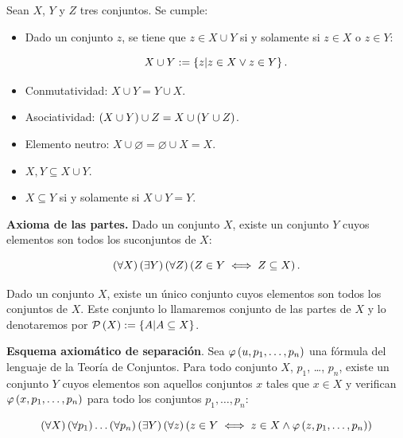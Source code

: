 \begin{proposition}
  \rm Sean $X$, $Y$ y $Z$ tres conjuntos. Se cumple:

  \begin{itemize}
    \item[1.] Dado un conjunto $z$, se tiene que $z\in X\cup Y$ si y solamente si $z\in X$ o $z\in Y$:
    
    \begin{equation}
      X\cup Y:=\left\{z\middle|z\in X\lor z\in Y\right\}.
    \end{equation}
    \item[2.] Conmutatividad: $X\cup Y=Y\cup X$.
    \item[3.] Asociatividad: $\left(X\cup Y\right)\cup Z=X\cup\left(Y\cup Z\right)$.
    \item[4.] Elemento neutro: $X\cup \varnothing=\varnothing\cup X=X$.
    \item[5.] $X,Y\subseteq X\cup Y$.
    \item[6.] $X\subseteq Y$ si y solamente si $X\cup Y=Y$.
\end{itemize}
\end{proposition}

\textbf{Axioma de las partes.} Dado un conjunto $X$, existe un conjunto $Y$ cuyos elementos son todos los suconjuntos de $X$:

\begin{equation}
  \left(\forall X\right)\left(\exists Y\right)\left(\forall Z\right)\left(Z\in Y\iff Z\subseteq X\right).
\end{equation}

\begin{proposition}
  \rm Dado un conjunto $X$, existe un único conjunto cuyos elementos son todos los conjuntos de $X$. Este conjunto lo llamaremos conjunto de las partes de $X$ y lo denotaremos por $\mathcal{P}\left(X\right):=\left\{A\middle|A\subseteq X\right\}$.
\end{proposition}

\textbf{Esquema axiomático de separación}. Sea $\varphi\left(u,p_1, \dots,p_n\right)$ una fórmula del lenguaje de la Teoría de Conjuntos. Para todo conjunto $X$, $p_1$, \dots, $p_n$, existe un conjunto $Y$ cuyos elementos son aquellos conjuntos $x$ tales que $x\in X$ y verifican $\varphi\left(x,p_1,\dots,p_n\right)$ para todo los conjuntos $p_1,\dots,p_n$:

\begin{equation}
    \left(\forall X\right)\left(\forall p_1\right)\dots\left(\forall p_n\right)\left(\exists Y\right)\left(\forall z\right)\left(z\in Y\iff z\in X\land \varphi\left(z,p_1,\dots,p_n\right)\right)
\end{equation}


